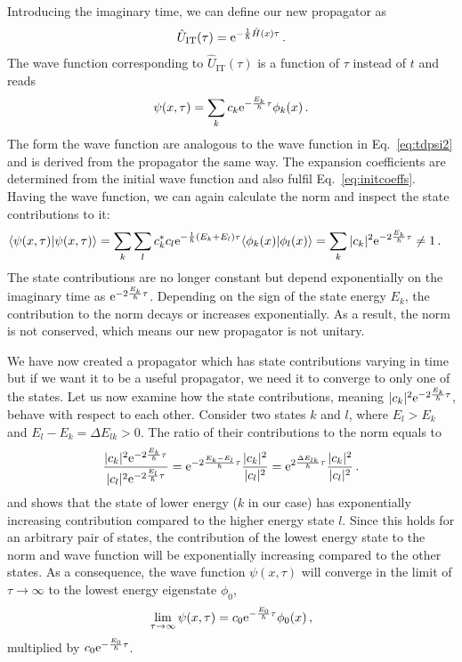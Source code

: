 Introducing the imaginary time, we can define our new propagator as
\begin{equation}
    \hat{U}_\mathrm{IT}(\tau) = \mathrm{e}^{-\frac{1}{\hbar}\hat{H}(x)\tau} \, .
\end{equation}
The wave function corresponding to $\hat{U}_\mathrm{IT}(\tau)$ is a function of $\tau$ instead of $t$ and reads
\begin{equation}
    \psi(x,\tau) = \sum_k c_k \mathrm{e}^{-\frac{E_k}{\hbar}\tau}\phi_k(x) \, .
\end{equation}
The form the wave function are analogous to the wave function in Eq.~\eqref{eq:tdpsi2} and is derived from the propagator the same way. The expansion coefficients are determined from the initial wave function and also fulfil Eq.~\eqref{eq:initcoeffs}.
Having the wave function, we can again calculate the norm and inspect the state contributions to it:
\begin{align}
    \langle\psi(x,\tau)|\psi(x,\tau)\rangle &= \sum_k \sum_l c_k^* c_l  \mathrm{e}^{-\frac{1}{\hbar}(E_k + E_l) \tau} \langle\phi_k(x)|\phi_l(x)\rangle =\sum_k |c_k|^2  \mathrm{e}^{-2\frac{E_k}{\hbar} \tau} \neq 1 \, .
\end{align}
The state contributions are no longer constant but depend exponentially on the imaginary time as $\mathrm{e}^{-2\frac{E_k}{\hbar} \tau}$. Depending on the sign of the state energy $E_k$, the contribution to the norm decays or increases exponentially. As a result, the norm is not conserved, which means our new propagator is not unitary.

We have now created a propagator which has state contributions varying in time but if we want it to be a useful propagator, we need it to converge to only one of the states. Let us now examine how the state contributions, meaning $|c_k|^2  \mathrm{e}^{-2\frac{E_k}{\hbar} \tau}$, behave with respect to each other. Consider two states $k$ and $l$, where $E_l > E_k$ and $E_l - E_k = \Delta E_{lk} > 0$. The ratio of their contributions to the norm equals to
\begin{equation}
    \frac{|c_k|^2  \mathrm{e}^{-2\frac{E_k}{\hbar}\tau}}{|c_l|^2  \mathrm{e}^{-2\frac{E_l}{\hbar}\tau}} =  \mathrm{e}^{-2\frac{E_k - E_l}{\hbar}\tau} \frac{|c_k|^2}{|c_l|^2}  = \mathrm{e}^{2\frac{\Delta E_{lk}}{\hbar}\tau} \frac{|c_k|^2}{|c_l|^2} \, .
\end{equation}
and shows that the state of lower energy ($k$ in our case) has exponentially increasing contribution compared to the higher energy state $l$. Since this holds for an arbitrary pair of states, the contribution of the lowest energy state to the norm and wave function will be exponentially increasing compared to the other states. As a consequence, the wave function $\psi(x,\tau)$ will converge in the limit of $\tau\to\infty$ to the lowest energy eigenstate $\phi_0$, 
\begin{equation}
    \lim_{\tau\to\infty} \psi(x,\tau) = c_0 \mathrm{e}^{-\frac{E_0}{\hbar}\tau} \phi_0(x) \, ,
\end{equation}
multiplied by $c_0 \mathrm{e}^{-\frac{E_0}{\hbar}\tau}$.

